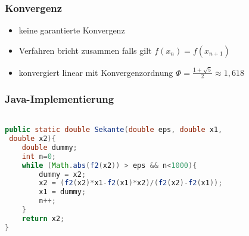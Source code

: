 \documentclass[table]{beamer}
\begin{document}
\begin{frame}
\frametitle{Konvergenz}
\begin{itemize}
\item	keine garantierte Konvergenz
\item Verfahren bricht zusammen falls gilt $f(x_n)=f(x_{n+1})$
\item	konvergiert linear mit Konvergenzordnung $\Phi = \frac{1 + \sqrt{5}}{2} \approx 1,618$
\end{itemize}
\end{frame}
\begin{frame}[fragile]
\frametitle{Java-Implementierung}
\begin{lstlisting}[language=Java,basicstyle=\ttfamily,keywordstyle=\color{blue}]

public static double Sekante(double eps, double x1, 
 double x2){
	double dummy;
	int n=0;
	while (Math.abs(f2(x2)) > eps && n<1000){
		dummy = x2;
		x2 = (f2(x2)*x1-f2(x1)*x2)/(f2(x2)-f2(x1));
		x1 = dummy;
		n++;
	}
	return x2;
}
\end{lstlisting}
\end{frame}
\end{document}
